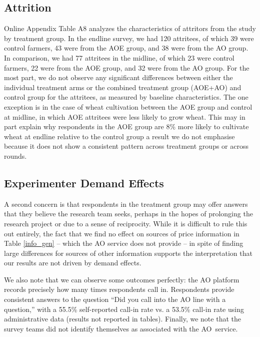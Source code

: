 \documentclass[12pt]{article}
\begin{document}
\subsection{\protect\normalsize Attrition}

{\normalsize Online Appendix Table A8 analyzes the characteristics of attritors
from the study by treatment group. In the endline survey, we had 120
attritees, of which 39 were control farmers, 43 were from the AOE group, and
38 were from the AO group. In comparison, we had 77 attritees in the
midline, of which 23 were control farmers, 22 were from the AOE group, and
32 were from the AO group. For the most part, we do not observe any significant differences
between either the individual treatment arms or the combined treatment group (AOE+AO) and control group for the attritees, as measured by baseline characteristics. The one exception is in the case of wheat
cultivation between the AOE group and control at midline, in which AOE
attritees were less likely to grow wheat. This may in part explain why
respondents in the AOE group are 8\% more likely to cultivate wheat at
endline relative to the control group a result we do not emphasise because
it does not show a consistent pattern across treatment groups or across
rounds. }

\subsection{\protect\normalsize Experimenter Demand Effects}

{\normalsize A second concern is that respondents in the treatment group may
offer answers that they believe the research team seeks, perhaps in the
hopes of prolonging the research project or due to a sense of reciprocity.
While it is difficult to rule this out entirely, the fact that we find no
effect on sources of price information in Table \ref{info_gen} -- which the AO service does not provide -- in spite of
finding large differences for sources of other information supports the
interpretation that our results are not driven by demand effects.

We also note that we can observe some outcomes perfectly: the AO platform records
precisely how many times respondents call in. Respondents provide consistent answers to the question \textquotedblleft {}Did you call into the
AO line with a question,\textquotedblright {} with a 55.5\% self-reported
call-in rate vs. a 53.5\% call-in rate using administrative data (results
not reported in tables). Finally, we note that the survey teams did not
identify themselves as associated with the AO\ service.}
\end{document}
